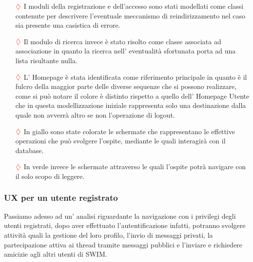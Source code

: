 \begin{itemize}
\item[$\textcolor{red}{\diamondsuit}$] I moduli della registrazione e dell'accesso sono stati modellati come classi contenute per descrivere l'eventuale meccanismo di reindirizzamento nel caso sia presente una casistica di errore. 
\item[$\textcolor{red}{\diamondsuit}$] Il modulo di ricerca invece è stato risolto come classe associata ad associazione in quanto la ricerca nell' eventualità sfortunata porta ad una lista risultante nulla.
\item[$\textcolor{red}{\diamondsuit}$] L' Homepage è stata identificata come riferimento principale in quanto è il fulcro della maggior parte delle diverse sequenze che si possono realizzare, come si può notare il colore è distinto rispetto a quello dell' Homepage Utente che in questa modellizzazione iniziale rappresenta solo una destinazione dalla quale non avverrà altro se non l'operazione di logout.
\item[$\textcolor{red}{\diamondsuit}$] In giallo sono state colorate le schermate che rappresentano le effettive operazioni che può svolgere l'ospite, mediante le quali interagirà con il database. 
\item[$\textcolor{red}{\diamondsuit}$] In verde invece le schermate attraverso le quali l'ospite potrà navigare con il solo scopo di leggere.
\end{itemize}

\pagebreak

\subsubsection{UX per un utente registrato}

Passiamo adesso ad un' analisi riguardante la navigazione con i privilegi degli utenti registrati, dopo aver effettuato l'autentificazione infatti, potranno svolgere attività quali la gestione del loro profilo, l'invio di messaggi privati, la partecipazione attiva ai thread tramite messaggi pubblici e l'inviare e richiedere amicizie agli altri utenti di SWIM.  

